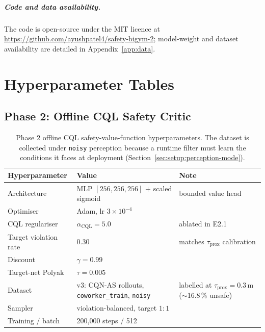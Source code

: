 \documentclass[11pt,a4paper]{report}
\newcommand{\cqnas}{CQN-AS}
\begin{document}
\paragraph{Code and data availability.}
The code is open-source under the MIT licence at
\url{https://github.com/ayushpatel4/safety-bigym-2}; model-weight and
dataset availability are detailed in Appendix~\ref{app:data}.

\clearpage
{}
{}


\appendix

\chapter{Hyperparameter Tables}
\label{app:hparams}

\section{Phase 2: Offline CQL Safety Critic}
\label{app:hparams:svf}

\begin{table}[htbp]
\centering
\small
\caption{Phase 2 offline CQL safety-value-function hyperparameters.
The dataset is collected under \texttt{noisy} perception because a
runtime filter must learn the conditions it faces at deployment
(Section~\ref{sec:setup:perception-mode}).}
\label{tab:app-hparams-svf}
\begin{tabular}{lll}
\toprule
Hyperparameter & Value & Note \\
\midrule
Architecture & MLP $[256, 256, 256]$ $+$ scaled sigmoid & bounded value head \\
Optimiser & Adam, lr $3\times 10^{-4}$ & \\
CQL regulariser & $\alpha_{\mathrm{CQL}} = 5.0$ & ablated in E2.1 \\
Target violation rate & $0.30$ & matches $\tau_{\mathrm{prox}}$ calibration \\
Discount & $\gamma = 0.99$ & \\
Target-net Polyak & $\tau = 0.005$ & \\
Dataset & v3: \cqnas{} rollouts, \texttt{coworker\_train}, \texttt{noisy} & labelled at $\tau_{\mathrm{prox}}{=}0.3$\,m ($\sim$16.8\,\% unsafe) \\
Sampler & violation-balanced, target $1{:}1$ & \\
Training / batch & 200{,}000 steps / 512 & \\
\bottomrule
\end{tabular}
\end{table}
\end{document}
